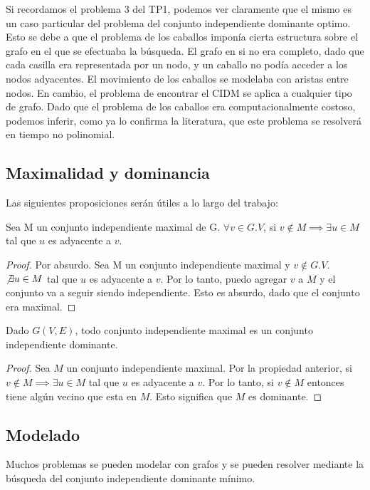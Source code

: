 Si recordamos el problema 3 del TP1, podemos ver claramente que el mismo es un caso particular del problema del conjunto independiente dominante optimo. Esto se debe a que el problema de los caballos imponía cierta estructura sobre el grafo en el que se efectuaba la búsqueda. El grafo en si no era completo, dado que cada casilla era representada por un nodo, y un caballo no podía acceder a los nodos adyacentes. El movimiento de los caballos se modelaba con aristas entre nodos. En cambio, el problema de encontrar el CIDM se aplica a cualquier tipo de grafo. Dado que el problema de los caballos era computacionalmente costoso, podemos inferir, como ya lo confirma la literatura, que este problema se resolverá en tiempo no polinomial.

\subsection{Maximalidad y dominancia}

Las siguientes proposiciones serán útiles a lo largo del trabajo:

\begin{proposition}
Sea M un conjunto independiente maximal de G. $\forall v \in G.V$, si $v \notin M \implies \exists u \in M$ tal que $u$ es adyacente a $v$. 
\end{proposition}

\begin{proof}
Por absurdo. Sea M un conjunto independiente maximal y $v \notin G.V$. $\not\exists u \in M$ tal que $u$ es adyacente a $v$. Por lo tanto, puedo agregar $v$ a $M$ y el conjunto va a seguir siendo independiente. Esto es absurdo, dado que el conjunto era maximal.
\end{proof}

\begin{proposition}
Dado $G(V,E)$, todo conjunto independiente maximal es un conjunto independiente dominante.
\end{proposition}

\begin{proof}
Sea $M$ un conjunto independiente maximal. Por la propiedad anterior, si $v \notin M \implies \exists u \in M$ tal que $u$ es adyacente a $v$. Por lo tanto, si $v \notin M$ entonces tiene algún vecino que esta en $M$. Esto significa que $M$ es dominante.
\end{proof}

\newpage

\subsection{Modelado}
Muchos problemas se pueden modelar con grafos y se pueden resolver mediante la búsqueda del conjunto independiente dominante mínimo.


